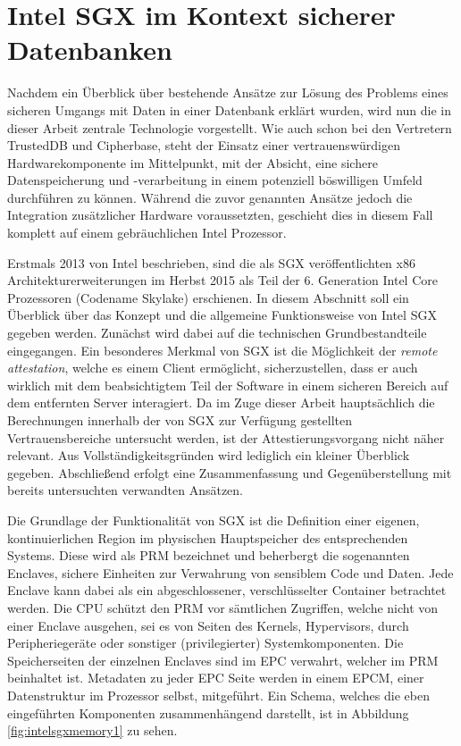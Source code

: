 
\section{Intel SGX im Kontext sicherer Datenbanken}

Nachdem ein Überblick über bestehende Ansätze zur Lösung des Problems eines sicheren Umgangs mit Daten in einer Datenbank erklärt wurden, wird nun die in dieser Arbeit zentrale Technologie vorgestellt. Wie auch schon bei den Vertretern TrustedDB und Cipherbase, steht der Einsatz einer vertrauenswürdigen Hardwarekomponente im Mittelpunkt, mit der Absicht, eine sichere Datenspeicherung und -verarbeitung in einem potenziell böswilligen Umfeld durchführen zu können. Während die zuvor genannten Ansätze jedoch die Integration zusätzlicher Hardware voraussetzten, geschieht dies in diesem Fall komplett auf einem gebräuchlichen Intel Prozessor.

Erstmals 2013 von Intel beschrieben, sind die als \ac{SGX} veröffentlichten x86 Architekturerweiterungen im Herbst 2015 als Teil der 6. Generation Intel Core Prozessoren (Codename Skylake) erschienen. In diesem Abschnitt soll ein Überblick über das Konzept und die allgemeine Funktionsweise von Intel \ac{SGX} gegeben werden. Zunächst wird dabei auf die technischen Grundbestandteile eingegangen. Ein besonderes Merkmal von \ac{SGX} ist die Möglichkeit der \textit{remote attestation}, welche es einem Client ermöglicht, sicherzustellen, dass er auch wirklich mit dem beabsichtigtem Teil der Software in einem sicheren Bereich auf dem entfernten Server interagiert. Da im Zuge dieser Arbeit hauptsächlich die Berechnungen innerhalb der von \ac{SGX} zur Verfügung gestellten Vertrauensbereiche untersucht werden, ist der Attestierungsvorgang nicht näher relevant. Aus Vollständigkeitsgründen wird lediglich ein kleiner Überblick gegeben. Abschließend erfolgt eine Zusammenfassung und Gegenüberstellung mit bereits untersuchten verwandten Ansätzen.

Die Grundlage der Funktionalität von \ac{SGX} ist die Definition einer eigenen, kontinuierlichen Region im physischen Hauptspeicher des entsprechenden Systems. Diese wird als \ac{PRM} bezeichnet und beherbergt die sogenannten Enclaves, sichere Einheiten zur Verwahrung von sensiblem Code und Daten. Jede Enclave kann dabei als ein abgeschlossener, verschlüsselter Container betrachtet werden. Die \ac{CPU} schützt den \ac{PRM} vor sämtlichen Zugriffen, welche nicht von einer Enclave ausgehen, sei es von Seiten des Kernels, Hypervisors, durch Peripheriegeräte oder sonstiger (privilegierter) Systemkomponenten. Die Speicherseiten der einzelnen Enclaves sind im \ac{EPC} verwahrt, welcher im PRM beinhaltet ist. Metadaten zu jeder \ac{EPC} Seite werden in einem \ac{EPCM}, einer Datenstruktur im Prozessor selbst, mitgeführt. Ein Schema, welches die eben eingeführten Komponenten zusammenhängend darstellt, ist in Abbildung \ref{fig:intelsgxmemory1} zu sehen.

